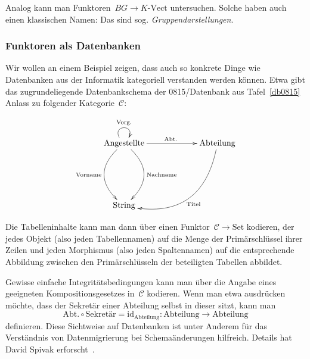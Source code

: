\documentclass[a4paper,ngerman]{scrartcl}
\theoremstyle{definition}
\theoremstyle{plain}
\theoremstyle{remark}
\newcommand{\C}{\mathcal{C}}
\newcommand{\id}{\mathrm{id}}
\newcommand{\Set}{\mathrm{Set}}
\newcommand{\Vect}{\mathrm{Vect}}
\begin{document}
Analog kann man Funktoren~$BG \to K\text{-}\Vect$ untersuchen. Solche haben
auch einen klassischen Namen: Das sind sog. \emph{Gruppendarstellungen}.


\subsubsection{Funktoren als Datenbanken}

Wir wollen an einem Beispiel zeigen, dass auch so konkrete Dinge wie
Datenbanken aus der Informatik kategoriell verstanden werden können. Etwa gibt
das zugrundeliegende Datenbankschema der 0815/Datenbank aus Tafel~\ref{db0815}
Anlass zu folgender Kategorie~$\C$:

\[ \xymatrixcolsep{5pc} \xymatrixrowsep{5pc} \xymatrix{
  \text{Angestellte}
    \ar@(ul,ur)^{\text{Vorg.}}
    \ar[r]^{\text{Abt.}}
    \ar@/^2pc/[d]^{\text{Nachname}}
    \ar@/_2pc/[d]_{\text{Vorname}}
  & \text{Abteilung}
    \ar@/^3pc/[dl]^{\text{Titel}} \\
  \text{String}
} \]

Die Tabelleninhalte kann man dann über einen Funktor~$\C \to \Set$ kodieren,
der jedes Objekt (also jeden Tabellennamen) auf die Menge der Primärschlüssel
ihrer Zeilen und jeden Morphismus (also jeden Spaltennamen) auf die
entsprechende Abbildung zwischen den Primärschlüsseln der beteiligten Tabellen
abbildet.

Gewisse einfache Integritätsbedingungen kann man über die Angabe eines
geeigneten Kompositionsgesetzes in~$\C$ kodieren. Wenn man etwa ausdrücken
möchte, dass der Sekretär einer Abteilung selbst in dieser sitzt, kann man
\[ \text{Abt.} \circ \text{Sekretär} = \id_{\text{Abteilung}} :
  \text{Abteilung} \to \text{Abteilung} \]
definieren. Diese Sichtweise auf Datenbanken ist unter Anderem für das
Verständnis von Datenmigrierung bei Schemaänderungen hilfreich. Details hat
David Spivak erforscht~\cite{spivak1,spivak2,spivak3}.
\end{document}
